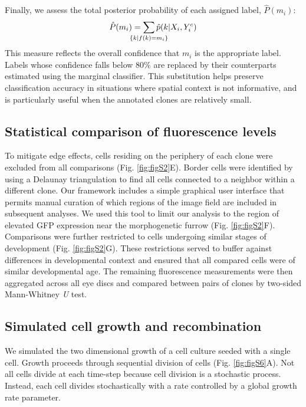 Finally, we assess the total posterior probability of each assigned label, $\hat{P}(m_i)$:
\begin{equation}
\hat{P}(m_i) = \sum_{ \mathclap{ \{ k | f(k)=m_i \}} } \hat{p}(k | X_i,Y^c_i)
\end{equation}
This measure reflects the overall confidence that $m_i$ is the appropriate label. Labels whose confidence falls below 80\% are replaced by their counterparts estimated using the marginal classifier. This substitution helps preserve classification accuracy in situations where spatial context is not informative, and is particularly useful when the annotated clones are relatively small.

\subsection{Statistical comparison of fluorescence levels}

To mitigate edge effects, cells residing on the periphery of each clone were excluded from all comparisons (Fig. \ref{fig:figS2}E). Border cells were identified by using a Delaunay triangulation to find all cells connected to a neighbor within a different clone. Our framework includes a simple graphical user interface that permits manual curation of which regions of the image field are included in subsequent analyses. We used this tool to limit our analysis to the region of elevated GFP expression near the morphogenetic furrow (Fig. \ref{fig:figS2}F). Comparisons were further restricted to cells undergoing similar stages of development (Fig. \ref{fig:figS2}G). These restrictions served to buffer against differences in developmental context and ensured that all compared cells were of similar developmental age. The remaining fluorescence measurements were then aggregated across all eye discs and compared between pairs of clones by two-sided Mann-Whitney \textit{U} test.

\subsection{Simulated cell growth and recombination}

We simulated the two dimensional growth of a cell culture seeded with a single cell. Growth proceeds through sequential division of cells (Fig. \ref{fig:figS6}A). Not all cells divide at each time-step because cell division is a stochastic process. Instead, each cell divides stochastically with a rate controlled by a global growth rate parameter.

